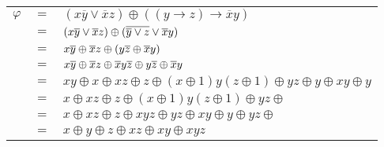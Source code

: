 \begin{solution}
\begin{enumerate}[a)]
    \begin{tabular}{l c l}
      $\varphi$ & $=$ & $(x\overline{y}\vee \overline{x}z)\oplus ((y\rightarrow z)\rightarrow \overline{x}y)$\\
      & $=$ & $(x\overline{y}\vee \overline{x}z) \oplus (\overline{\overline{y}\vee z} \vee \overline{x}y)$ \\
      & $=$ & $x\overline{y}\oplus \overline{x}z \oplus (y\overline{z} \oplus \overline{x}y)$ \\
      & $=$ & $x\overline{y}\oplus \overline{x}z\oplus \overline{x}y\overline{z} \oplus y\overline{z} \oplus \overline{x}y$ \\
      & $=$ & $xy \oplus x \oplus xz \oplus z \oplus (x\oplus 1)y(z\oplus 1) \oplus yz\oplus y \oplus xy \oplus y$ \\
      & $=$ & $x \oplus xz \oplus z \oplus (x\oplus 1)y(z\oplus 1) \oplus yz\oplus $ \\
      & $=$ & $x \oplus xz \oplus z \oplus xyz \oplus yz \oplus xy \oplus y \oplus yz\oplus $ \\
      & $=$ & $x \oplus y\oplus z \oplus xz \oplus xy \oplus xyz$ \\
     \end{tabular}
     
     

     
    

\end{enumerate}
\end{solution}
